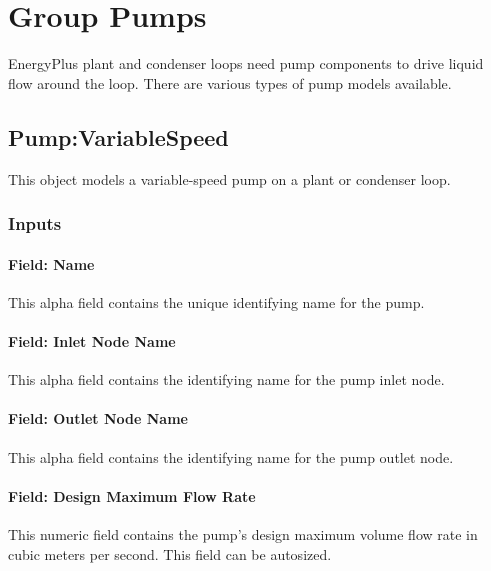 \section{Group Pumps}\label{group-pumps}

EnergyPlus plant and condenser loops need pump components to drive liquid flow around the loop. There are various types of pump models available.

\subsection{Pump:VariableSpeed}\label{pumpvariablespeed}

This object models a variable-speed pump on a plant or condenser loop.

\subsubsection{Inputs}\label{inputs-037}

\paragraph{Field: Name}\label{field-name-036}

This alpha field contains the unique identifying name for the pump.

\paragraph{Field: Inlet Node Name}\label{field-inlet-node-name-005}

This alpha field contains the identifying name for the pump inlet node.

\paragraph{Field: Outlet Node Name}\label{field-outlet-node-name-006}

This alpha field contains the identifying name for the pump outlet node.

\paragraph{Field: Design Maximum Flow Rate}\label{field-design-maximum-flow-rate}

This numeric field contains the pump's design maximum volume flow rate in cubic meters per second. This field can be autosized.

